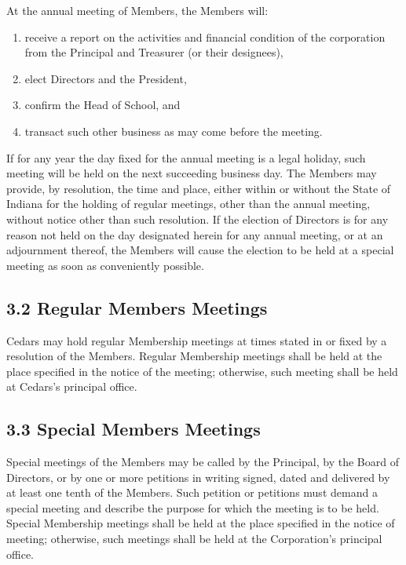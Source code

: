 \documentclass[
]{book}
\begin{document}
At the annual meeting of Members, the Members will:

\begin{enumerate}
\def\labelenumi{\alph{enumi}.}
\item
  receive a report on the activities and financial condition of the corporation from the Principal and Treasurer (or their designees),
\item
  elect Directors and the President,
\item
  confirm the Head of School, and
\item
  transact such other business as may come before the meeting.
\end{enumerate}

If for any year the day fixed for the annual meeting is a legal holiday, such meeting will be held on the next succeeding business day. The Members may provide, by resolution, the time and place, either within or without the State of Indiana for the holding of regular meetings, other than the annual meeting, without notice other than such resolution. If the election of Directors is for any reason not held on the day designated herein for any annual meeting, or at an adjournment thereof, the Members will cause the election to be held at a special meeting as soon as conveniently possible.

\subsection*{3.2 Regular Members Meetings}\label{regular-members-meetings}

Cedars may hold regular Membership meetings at times stated in or fixed by a resolution of the Members. Regular Membership meetings shall be held at the place specified in the notice of the meeting; otherwise, such meeting shall be held at Cedars's principal office.

\subsection*{3.3 Special Members Meetings}\label{special-members-meetings}

Special meetings of the Members may be called by the Principal, by the Board of Directors, or by one or more petitions in writing signed, dated and delivered by at least one tenth of the Members. Such petition or petitions must demand a special meeting and describe the purpose for which the meeting is to be held. Special Membership meetings shall be held at the place specified in the notice of meeting; otherwise, such meetings shall be held at the Corporation's principal office.
\end{document}
